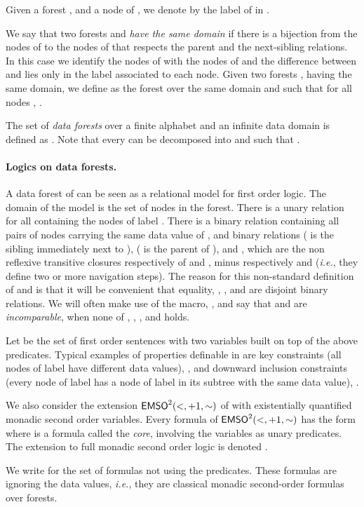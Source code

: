 \documentclass{CSML}
\newcommand\neighbor{\ensuremath{\mathord{+}1}}
\newcommand\descendant{\ensuremath{\mathord{<}}}
\newcommand\emsotwo{\ensuremath{\emso^2(\descendant,\neighbor,\mathord{\sim})}\xspace}
\begin{document}
Given a forest , and a node  of , we denote
by  the label of  in .

We say that two forests  
and  
\emph{have the same domain} if there is a bijection from the
nodes of  to the nodes of  
that respects the parent and the next-sibling relations. 
In this case we identify the nodes of  with
the nodes of  and the difference between  and  lies
only in the label associated to each node. 
Given two forests , 
 having the same domain, 
we define  
as the forest over the same domain 
and such that for all nodes , 
.

The set of \emph{data forests} over a finite alphabet  
and an infinite data domain   is defined as . 
Note that every  
can be decomposed into  
and  such that .


\paragraph{Logics on data forests.}
A data forest of  can be seen as a relational model for
first order logic.  The domain of the model is the set of nodes in the
forest.  There is a unary relation  for all  containing
the nodes of label . There is a binary relation  containing all
pairs of nodes carrying the same data value of , 
and binary relations  ( is the sibling immediately next to ),
 ( is the parent of ), and ,  which are the non
reflexive transitive closures respectively of  and , minus
respectively  and  (\textit{i.e.}, they define two or more navigation steps).
The reason for this non-standard definition of  and  is that it
will be convenient that equality, , ,  and  are disjoint
binary relations. We will often make use of the macro, , and say
that  and  are \emph{incomparable}, when none of , ,
,  and  holds.


Let \fotwo be the set of first order sentences with two variables built on top
of the above predicates. Typical examples of properties definable in \fotwo are
key constraints (all nodes of label  have different data values), , and downward inclusion
constraints (every node  of label  has a node  of label  in its
subtree with the same data value), 
.

We also consider the extension \emsotwo of \fotwo with existentially quantified
monadic second order variables.  Every formula of \emsotwo has the form
 where  is a \fotwo formula called
the \emph{core}, involving the variables  as unary
predicates.  The extension to full monadic second order logic is denoted
.

We write  for the set of formulas not using the  predicates.
These formulas are ignoring the data values, \textit{i.e.}, 
they are classical monadic second-order formulas over forests.
\end{document}

